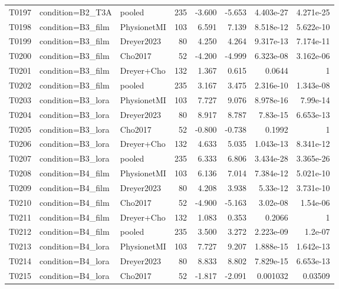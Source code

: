 \begin{longtable}{p{.45in}p{2.6in}p{.75in}rrrrr}
T0197 & condition=B2\_\allowbreak{}T3A & pooled & 235 & -3.600 & -5.653 & 4.403e-27 & 4.271e-25 \\
T0198 & condition=B3\_\allowbreak{}film & PhysionetMI & 103 & 6.591 & 7.139 & 8.518e-12 & 5.622e-10 \\
T0199 & condition=B3\_\allowbreak{}film & Dreyer2023 & 80 & 4.250 & 4.264 & 9.317e-13 & 7.174e-11 \\
T0200 & condition=B3\_\allowbreak{}film & Cho2017 & 52 & -4.200 & -4.999 & 6.323e-08 & 3.162e-06 \\
T0201 & condition=B3\_\allowbreak{}film & Dreyer+Cho & 132 & 1.367 & 0.615 & 0.0644 & 1 \\
T0202 & condition=B3\_\allowbreak{}film & pooled & 235 & 3.167 & 3.475 & 2.316e-10 & 1.343e-08 \\
T0203 & condition=B3\_\allowbreak{}lora & PhysionetMI & 103 & 7.727 & 9.076 & 8.978e-16 & 7.99e-14 \\
T0204 & condition=B3\_\allowbreak{}lora & Dreyer2023 & 80 & 8.917 & 8.787 & 7.83e-15 & 6.653e-13 \\
T0205 & condition=B3\_\allowbreak{}lora & Cho2017 & 52 & -0.800 & -0.738 & 0.1992 & 1 \\
T0206 & condition=B3\_\allowbreak{}lora & Dreyer+Cho & 132 & 4.633 & 5.035 & 1.043e-13 & 8.341e-12 \\
T0207 & condition=B3\_\allowbreak{}lora & pooled & 235 & 6.333 & 6.806 & 3.434e-28 & 3.365e-26 \\
T0208 & condition=B4\_\allowbreak{}film & PhysionetMI & 103 & 6.136 & 7.014 & 7.384e-12 & 5.021e-10 \\
T0209 & condition=B4\_\allowbreak{}film & Dreyer2023 & 80 & 4.208 & 3.938 & 5.33e-12 & 3.731e-10 \\
T0210 & condition=B4\_\allowbreak{}film & Cho2017 & 52 & -4.900 & -5.163 & 3.02e-08 & 1.54e-06 \\
T0211 & condition=B4\_\allowbreak{}film & Dreyer+Cho & 132 & 1.083 & 0.353 & 0.2066 & 1 \\
T0212 & condition=B4\_\allowbreak{}film & pooled & 235 & 3.500 & 3.272 & 2.223e-09 & 1.2e-07 \\
T0213 & condition=B4\_\allowbreak{}lora & PhysionetMI & 103 & 7.727 & 9.207 & 1.888e-15 & 1.642e-13 \\
T0214 & condition=B4\_\allowbreak{}lora & Dreyer2023 & 80 & 8.833 & 8.802 & 7.829e-15 & 6.653e-13 \\
T0215 & condition=B4\_\allowbreak{}lora & Cho2017 & 52 & -1.817 & -2.091 & 0.001032 & 0.03509 \\

\end{longtable}
